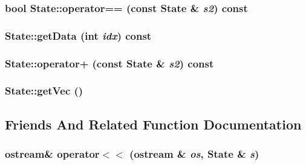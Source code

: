 \subsubsection{\setlength{\rightskip}{0pt plus 5cm}bool State::operator== (const {\bf State} \& {\em s2}) const\hspace{0.3cm}{\tt  [inline]}}\label{classState_022d012312dbd1c3cb170e752a4cc726}


\subsubsection{ State::getData (int {\em idx}) const\hspace{0.3cm}{\tt  [inline]}}\label{classState_2b022e8fcebaec720672e42fde918337}


\subsubsection{ State::operator+ (const {\bf State} \& {\em s2}) const\hspace{0.3cm}{\tt  [inline]}}\label{classState_41cf21cb4c380e045a360b7061f8da73}


\subsubsection{ State::getVec ()\hspace{0.3cm}{\tt  [inline]}}\label{classState_a37002bfd280361ce414b6c7ee97ef47}




\subsection{Friends And Related Function Documentation}
\subsubsection{\setlength{\rightskip}{0pt plus 5cm}ostream\& operator$<$$<$ (ostream \& {\em os}, {\bf State} \& {\em s})\hspace{0.3cm}{\tt  [friend]}}\label{classState_29d139259ad178fd96a89e26b2901cbe}





